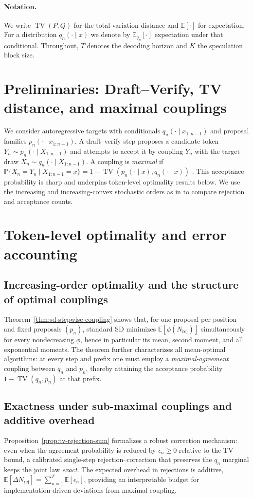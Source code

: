 \documentclass[11pt]{article}
\numberwithin{equation}{section}
\theoremstyle{plain}
\theoremstyle{definition}
\theoremstyle{remark}
\newcommand{\TV}{\operatorname{TV}}
\newcommand{\E}{\mathbb{E}}
\newcommand{\Prb}{\mathbb{P}}
\begin{document}
\paragraph{Notation.} We write $\TV(P,Q)$ for the total-variation distance and $\E[\cdot]$ for expectation. For a distribution $q_n(\cdot\mid x)$ we denote by $\E_{q_n}[\cdot]$ expectation under that conditional. Throughout, $T$ denotes the decoding horizon and $K$ the speculation block size.

\section{Preliminaries: Draft--Verify, TV distance, and maximal couplings}
We consider autoregressive targets with conditionals $q_n(\cdot\mid x_{1:n-1})$ and proposal families $p_n(\cdot\mid x_{1:n-1})$. A draft--verify step proposes a candidate token $Y_n\sim p_n(\cdot\mid X_{1:n-1})$ and attempts to accept it by coupling $Y_n$ with the target draw $X_n\sim q_n(\cdot\mid X_{1:n-1})$. A coupling is \emph{maximal} if $\Prb\{X_n=Y_n\mid X_{1:n-1}=x\}=1-\TV(p_n(\cdot\mid x),q_n(\cdot\mid x))$ \cite{Lindvall2002CouplingMethod}. This acceptance probability is sharp and underpins token-level optimality results below. We use the increasing and increasing-convex stochastic orders as in \cite{ShakedShanthikumar2007StochasticOrders} to compare rejection and acceptance counts.

\section{Token-level optimality and error accounting}
\label{sec:stepwise}
\subsection{Increasing-order optimality and the structure of optimal couplings}

Theorem~\ref{thm:sd-stepwise-coupling} shows that, for one proposal per position and fixed proposals $(p_n)$, standard SD minimizes $\E[\phi(N_{\mathrm{rej}})]$ simultaneously for every nondecreasing $\phi$, hence in particular its mean, second moment, and all exponential moments. The theorem further characterizes all mean-optimal algorithms: at every step and prefix one must employ a \emph{maximal-agreement} coupling between $q_n$ and $p_n$, thereby attaining the acceptance probability $1-\TV(q_n,p_n)$ at that prefix.

\subsection{Exactness under sub-maximal couplings and additive overhead}

Proposition~\ref{prop:tv-rejection-sum} formalizes a robust correction mechanism: even when the agreement probability is reduced by $\epsilon_n\ge 0$ relative to the TV bound, a calibrated single-step rejection--correction that preserves the $q_n$ marginal keeps the joint law \emph{exact}. The expected overhead in rejections is additive, $\E[\Delta N_{\mathrm{rej}}]=\sum_{n=1}^T\E[\epsilon_n]$, providing an interpretable budget for implementation-driven deviations from maximal coupling.
\end{document}
